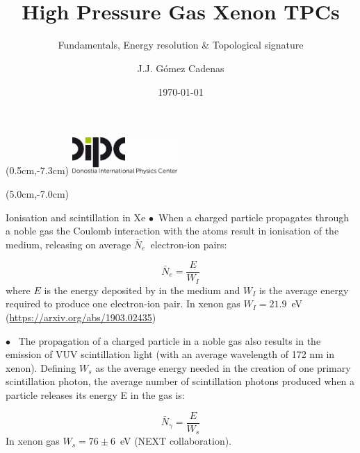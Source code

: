 \documentclass [aspectratio=169]{beamer}
\title[]{\vspace{60pt} \\
High Pressure Gas Xenon TPCs} %
\subtitle{Fundamentals, Energy resolution  \& Topological signature}
\author[]{J.J. Gómez Cadenas}
\institute[]{Donostia International Physics Center}
\date{\today}
\newcommand{\nne}{\ensuremath{\bar{N}_e}}
\newcommand{\nng}{\ensuremath{\bar{N}_\gamma}}
\begin{document}
{
\begin{frame}
    \titlepage
    \begin{textblock*}{4cm}(0.5cm,-7.3cm)
        \includegraphics[width=4cm]{dipc.png}
    \end{textblock*}
    \begin{textblock*}{8cm}(5.0cm,-7.0cm)
        \huge {} %
    \end{textblock*}
\end{frame}
}

\begin{frame}{Ionisation and scintillation in Xe}
$\bullet$~When a charged particle propagates through a noble gas the Coulomb interaction with the atoms result in ionisation of the medium, releasing on average \nne\ electron-ion pairs:

\[
\nne = \frac{E}{W_I}
\]
where $E$ is the energy deposited by in the medium and $W_I$ is the average energy required to produce one electron-ion pair. In xenon gas $W_I=21.9$~eV (\url{https://arxiv.org/abs/1903.02435})


$\bullet$~ The propagation of a charged particle in a noble gas also results in the emission of VUV scintillation
light (with an average wavelength of 172 nm in xenon). Defining $W_s$ as the average energy needed in the
creation of one primary scintillation photon, the average number of scintillation photons produced when a
particle releases its energy E in the gas is:

\[
\nng = \frac{E}{W_s}
\]
In xenon gas $W_s =76 \pm 6$~eV (NEXT collaboration). 
\end{frame}

\end{document}
